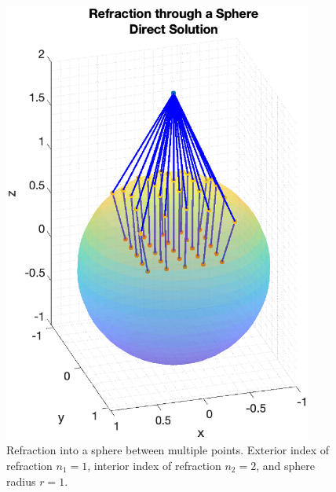 \begin{figure}[H] 
   \centering
   \includegraphics[width=4in]{ReflectionRefraction/Figures/refractionspheredirect} 
   \caption{Refraction into a sphere between multiple points. Exterior index of refraction $n_1 = 1$, interior index of refraction $n_2 = 2$, and sphere radius $r = 1$. }
\end{figure}



{\footnotesize
{}
}









